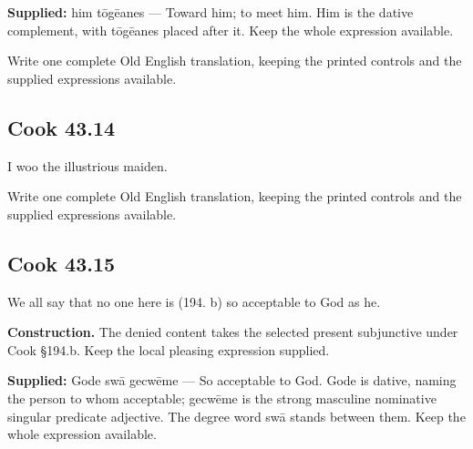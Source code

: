 \textbf{Supplied:} him tōgēanes — Toward him; to meet him. Him is the dative complement, with tōgēanes placed after it. Keep the whole expression available.

Write one complete Old English translation, keeping the printed controls and the supplied expressions available.

\par\begin{minipage}{\linewidth}\raggedright
\subsection*{Cook 43.14}

I woo the illustrious maiden.

Write one complete Old English translation, keeping the printed controls and the supplied expressions available.

\end{minipage}\par\addvspace{4pt}

\par\begin{minipage}{\linewidth}\raggedright
\subsection*{Cook 43.15}

We all say that no one here is (194. b) so acceptable to God as he.

\textbf{Construction.} The denied content takes the selected present subjunctive under Cook §194.b. Keep the local pleasing expression supplied.

\end{minipage}\par\addvspace{4pt}

\textbf{Supplied:} Gode swā gecwēme — So acceptable to God. Gode is dative, naming the person to whom acceptable; gecwēme is the strong masculine nominative singular predicate adjective. The degree word swā stands between them. Keep the whole expression available.

